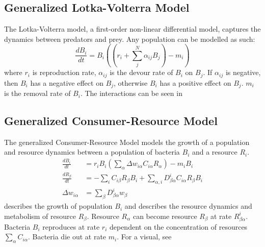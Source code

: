 \subsection{Generalized Lotka-Volterra Model}
The Lotka-Volterra model, a first-order non-linear differential model, captures the dynamics between predators and prey.
Any population can be modelled as such:
\[ 
    \frac{d{B}_i}{dt} = {B}_i \left(\left(r_i + \sum_{j}^{N} \alpha_{ij}{B}_j \right) - m_i\right)
\]
where $r_i$ is reproduction rate, $\alpha_{ij}$ is the devour rate of $B_i$ on $B_j$. If $\alpha_{ij}$ is negative, then $B_i$ has a negative effect on $B_j$, otherwise $B_i$ has a positive effect on $B_j$. $m_i$ is the removal rate of $B_i$. 
The interactions can be seen in 
 
\subsection{Generalized Consumer-Resource Model}
The generalized Consumer-Resource Model models the growth of a population and resource dynamics between a population of bacteria ${B}_i$ and a resource ${R}_i$. 
\begin{align}
    \frac{d{B}_i}{dt} &= r_i{B}_i \left(\sum_{\alpha} \Delta w_{i \alpha}C_{i \alpha}R_{\alpha}\right) - m_i {B}_i \label{eq:generalized_consumer_resource_model_1}\\
    \frac{dR_{\beta}}{dt} &= -\sum_i C_{i\beta}R_{\beta}{B_i} + \sum_{\alpha, i}D_{\beta\alpha}^{i}C_{i\alpha}R_{\beta}{B}_i \label{eq:generalized_consumer_resource_model_2}\\
    \Delta w_{i\alpha} &= \sum_{\beta}D_{\beta \alpha}^{i}w_{\beta} \nonumber
\end{align}
 describes the growth of population $B_i$ and  describes the resource dynamics and metabolism of resource $R_\beta$. 
Resource $R_\alpha$ can become resource $R_\beta$ at rate $R_{\beta \alpha}^{i}$. 
Bacteria $B_i$ reproduces at rate $r_i$ dependent on the concentration of resources $\sum_\alpha C_{i\alpha}$. 
Bacteria die out at rate $m_i$. 
For a visual, see 


